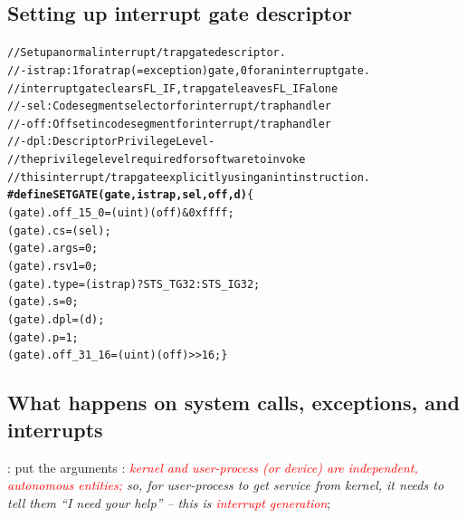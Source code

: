 \documentclass{note}
\begin{document}
{\subsection{Setting up interrupt gate descriptor}
\begin{alltt}
// Set up a normal interrupt/trap gate descriptor.
// - istrap: 1 for a trap (= exception) gate, 0 for an interrupt gate.
//   interrupt gate clears FL_IF, trap gate leaves FL_IF alone
// - sel: Code segment selector for interrupt/trap handler
// - off: Offset in code segment for interrupt/trap handler
// - dpl: Descriptor Privilege Level -
//        the privilege level required for software to invoke
//        this interrupt/trap gate explicitly using an int instruction.
\textcolor{red2}{\textbf{#define SETGATE(gate, istrap, sel, off, d)}} \{
  (gate).off_15_0 = (uint)(off) \& 0xffff;         
  (gate).cs = (sel);                               
  (gate).args = 0;                                 
  (gate).rsv1 = 0;                                 
  (gate).type = (istrap) ? STS_TG32 : STS_IG32;    
  (gate).s = 0;                                    
  (gate).dpl = (d);                                
  (gate).p = 1;                                    
  (gate).off_31_16 = (uint)(off) >> 16; \}
\end{alltt}


   

\subsection{What happens on system calls, exceptions, and interrupts}
\ben
\w {}: put the arguments
\w {}: 
    {\em \textcolor{red}{kernel and user-process (or device) are independent,
      autonomous entities;} so, for user-process to get service from kernel,
      it needs to tell them ``I need your help'' -- this is
      \textcolor{red}{interrupt generation}};

}
\end{document}
